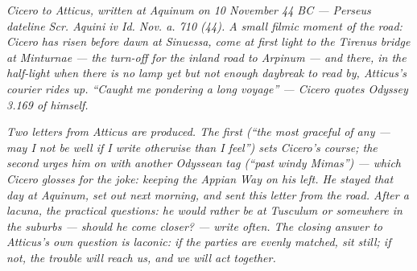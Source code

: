 
\textit{Cicero to Atticus, written at Aquinum on 10
November 44 BC --- Perseus dateline \textit{Scr. Aquini iv
Id. Nov. a. 710 (44)}. A small filmic moment of the road:
Cicero has risen before dawn at Sinuessa, come at first
light to the Tirenus bridge at Minturnae --- the
turn-off for the inland road to Arpinum --- and there, in
the half-light when there is no lamp yet but not enough
daybreak to read by, Atticus's courier rides up. ``Caught me
pondering a long voyage'' --- Cicero quotes Odyssey 3.169 of
himself.}

\textit{Two letters from Atticus are produced. The first
(``the most graceful of any --- may I not be well if I
write otherwise than I feel'') sets Cicero's course; the
second urges him on with another Odyssean tag (``past windy
Mimas'') --- which Cicero glosses for the joke: keeping the
Appian Way on his left. He stayed that day at Aquinum, set
out next morning, and sent this letter from the road. After
a lacuna, the practical questions: he would rather be at
Tusculum or somewhere in the suburbs --- should he come
closer? --- write often. The closing answer to Atticus's
own question is laconic: if the parties are evenly matched,
sit still; if not, the trouble will reach us, and we will
act together.}
